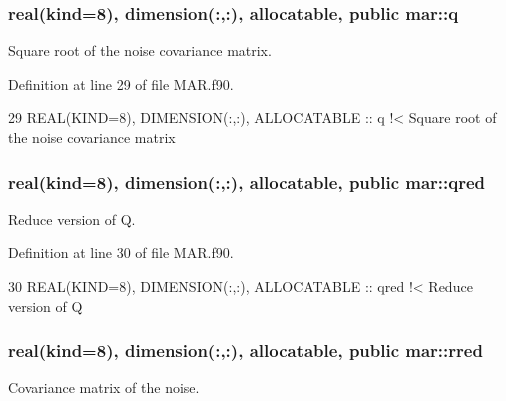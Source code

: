 \subsubsection[{\texorpdfstring{q}{q}}]{\setlength{\rightskip}{0pt plus 5cm}real(kind=8), dimension(\+:,\+:), allocatable, public mar\+::q}\hypertarget{namespacemar_a92dfc55f0e9c6d1fc05f03f30df2e526}{}\label{namespacemar_a92dfc55f0e9c6d1fc05f03f30df2e526}


Square root of the noise covariance matrix. 



Definition at line 29 of file M\+A\+R.\+f90.


\begin{DoxyCode}
29   \textcolor{keywordtype}{REAL(KIND=8)}, \textcolor{keywordtype}{DIMENSION(:,:)}, \textcolor{keywordtype}{ALLOCATABLE} :: q\textcolor{comment}{ !< Square root of the noise covariance matrix}
\end{DoxyCode}
\subsubsection[{\texorpdfstring{qred}{qred}}]{\setlength{\rightskip}{0pt plus 5cm}real(kind=8), dimension(\+:,\+:), allocatable, public mar\+::qred}\hypertarget{namespacemar_a0fa33035c3ff86abcb91dfaf29dd90d4}{}\label{namespacemar_a0fa33035c3ff86abcb91dfaf29dd90d4}


Reduce version of Q. 



Definition at line 30 of file M\+A\+R.\+f90.


\begin{DoxyCode}
30   \textcolor{keywordtype}{REAL(KIND=8)}, \textcolor{keywordtype}{DIMENSION(:,:)}, \textcolor{keywordtype}{ALLOCATABLE} :: qred\textcolor{comment}{ !< Reduce version of Q}
\end{DoxyCode}
\subsubsection[{\texorpdfstring{rred}{rred}}]{\setlength{\rightskip}{0pt plus 5cm}real(kind=8), dimension(\+:,\+:), allocatable, public mar\+::rred}\hypertarget{namespacemar_a315f9c1483809c1c037c88242c5d85e7}{}\label{namespacemar_a315f9c1483809c1c037c88242c5d85e7}


Covariance matrix of the noise. 



